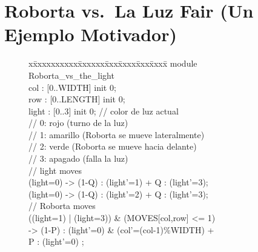\newcommand{\roborta}{Roborta\xspace}
\section{\roborta vs.\ La Luz Fair (Un Ejemplo Motivador)} \label{sec:mot_example_fair}

\begin{figure}[h]
\centering
\begin{minipage}[h]{.47\textwidth}
{\fontsize{8.6}{8.6}\selectfont\ttfamily
\begin{tabbing}
x\=xxxxxxxxxx\=xxxxxx\=xxx\=xxxx\=xxx\=xxxx\= \kill    
module \roborta\_vs\_the\_light\\[1ex]
\>col : [0..WIDTH] init 0; \\
\>row : [0..LENGTH] init 0; \\
\>light : [0..3] init 0; \>\>\>\> // color de luz actual \\%
\>                   \>\>\>\>// 0: rojo (turno de la luz) \\%
\>                   \>\>\>\>// 1: amarillo (\roborta se mueve lateralmente) \\%
\>                   \>\>\>\>// 2: verde (\roborta se mueve hacia delante) \\%
\>                   \>\>\>\>// 3: apagado (falla la luz) \\[1ex]
\> // light moves \\[1ex]
\>[l\_y] (light=0) \> \>-> \>(1-Q) : (light'=1) + Q : (light'=3);\\[1ex]
\>[l\_g] (light=0) \> \>-> \>(1-Q) : (light'=2) + Q : (light'=3);\\[1ex]
\> // \roborta moves \\[1ex]
\>[r\_l]  ((light=1) | (light=3)) \& (MOVES[col,row] <= 1)  \\
\>                    \>\>-> \>(1-P) : (light'=0) \& (col'=(col-1)\%WIDTH) + \\       
\>                     \>\>\>  P : (light'=0) ; \\[1ex]


\end{tabbing}}
\end{minipage}
\end{figure}
